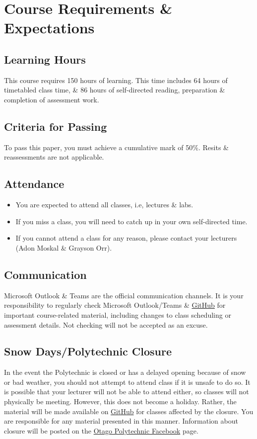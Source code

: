 \documentclass{article}
\begin{document}
\section*{Course Requirements \& Expectations}

\subsection*{Learning Hours}
This course requires 150 hours of learning. This time includes 64 hours of timetabled class time, \& 86 hours of self-directed reading, preparation \& completion of assessment work.

\subsection*{Criteria for Passing}
To pass this paper, you must achieve a cumulative mark of 50\%. Resits \& reassessments are not applicable.

\subsection*{Attendance}
\begin{itemize}
	\item You are expected to attend all classes, i.e, lectures \& labs.
	\item If you miss a class, you will need to catch up in your own self-directed time.
	\item If you cannot attend a class for any reason, please contact your lecturers (Adon Moskal \& Grayson Orr).
\end{itemize}

\subsection*{Communication}
Microsoft Outlook \& Teams are the official communication channels. It is your responsibility to regularly check Microsoft Outlook/Teams \& \href{https://github.com/otago-polytechnic-bit-courses/intro-app-dev-concepts}{GitHub} for important course-related material, including changes to class scheduling or assessment details. Not checking will not be accepted as an excuse.

\subsection*{Snow Days/Polytechnic Closure}
In the event the Polytechnic is closed or has a delayed opening because of snow or bad weather, you should not attempt to attend class if it is unsafe to do so. It is possible that your lecturer will not be able to attend either, so classes will not physically be meeting. However, this does not become a holiday. Rather, the material will be made available on \href{https://github.com/otago-polytechnic-bit-courses/intro-app-dev-concepts}{GitHub} for classes affected by the closure. You are responsible for any material presented in this manner. Information about closure will be posted on the \href{https://www.facebook.com/OtagoPoly}{Otago Polytechnic Facebook} page.
\end{document}
